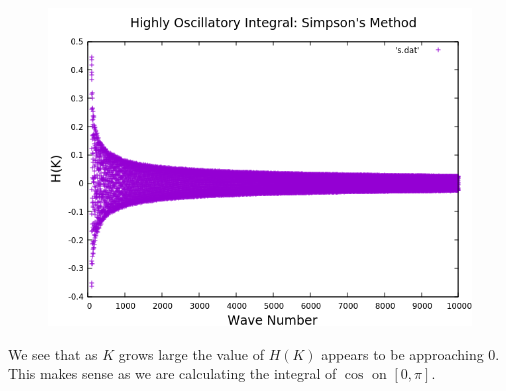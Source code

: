 \documentclass{article}
\theoremstyle{remark}
\theoremstyle{remark}
\begin{document}
	\begin{figure}[H]\centering
		\includegraphics[scale=0.4]{s.png}
	\end{figure}
	We see that as $K$ grows large the value of $H(K)$ appears to be approaching $0$. This makes sense as we are calculating the integral of $\cos$ on $[0,\pi]$.
	
\end{document}
